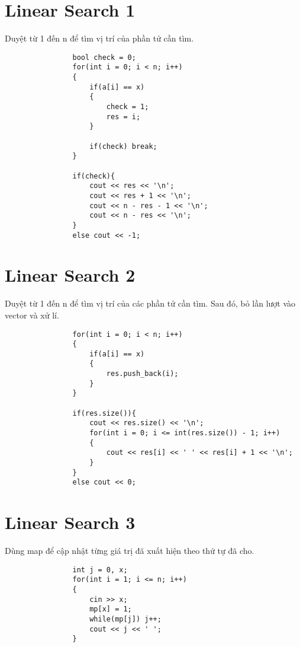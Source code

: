 \documentclass{article}
\begin{document}
\section*{Linear Search 1}
Duyệt từ 1 đến n để tìm vị trí của phần tử cần tìm.

 \begin{verbatim}
                bool check = 0;
                for(int i = 0; i < n; i++)
                {
                    if(a[i] == x)
                    {
                        check = 1;
                        res = i;
                    }
                    
                    if(check) break;
                }
            
                if(check){
                    cout << res << '\n';
                    cout << res + 1 << '\n';
                    cout << n - res - 1 << '\n';
                    cout << n - res << '\n'; 
                }
                else cout << -1;
\end{verbatim}

\section*{Linear Search 2}
Duyệt từ 1 đến n để tìm vị trí của các phần tử cần tìm. Sau đó, bỏ lần lượt vào vector và xử lí. \\

 \begin{verbatim}
                for(int i = 0; i < n; i++)
                {
                    if(a[i] == x)
                    {
                        res.push_back(i);
                    }
                }
            
                if(res.size()){
                    cout << res.size() << '\n';
                    for(int i = 0; i <= int(res.size()) - 1; i++)
                    {
                        cout << res[i] << ' ' << res[i] + 1 << '\n';
                    }
                }
                else cout << 0;
\end{verbatim}

\section*{Linear Search 3}
Dùng map để cập nhật từng giá trị đã xuất hiện theo thứ tự đã cho.

 \begin{verbatim}
                int j = 0, x;
                for(int i = 1; i <= n; i++)
                {
                    cin >> x;
                    mp[x] = 1;
                    while(mp[j]) j++;
                    cout << j << ' ';
                }
\end{verbatim}
\end{document}
